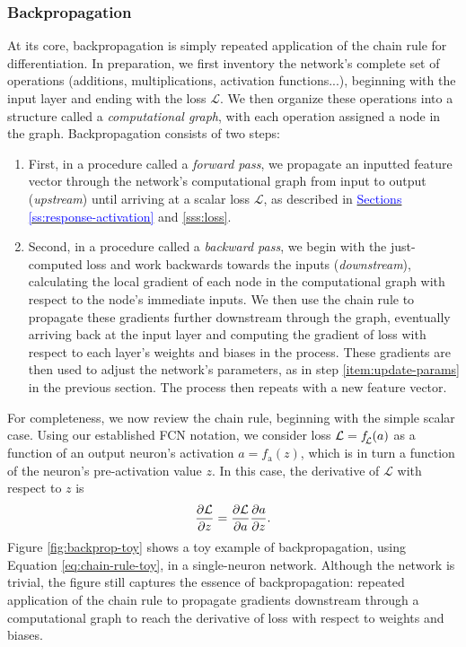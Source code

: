 \documentclass[11pt, a4paper]{article}
\newcommand{\myhref}[2]{\hyperref[#1]{\textcolor{blue}{#2}}}
\begin{document}
\subsubsection{Backpropagation}
At its core, backpropagation is simply repeated application of the chain rule for differentiation.
In preparation, we first inventory the network's complete set of operations (additions, multiplications, activation functions...), beginning with the input layer and ending with the loss $ \mathcal{L} $.
We then organize these operations into a structure called a \textit{computational graph}, with each operation assigned a node in the graph.
Backpropagation consists of two steps:
\begin{enumerate}

    \item First, in a procedure called a \textit{forward pass}, we propagate an inputted feature vector through the network's computational graph from input to output (\textit{upstream}) until arriving at a scalar loss $ \mathcal{L} $, as described in \myhref{ss:response-activation}{Sections \ref{ss:response-activation}} and \ref{sss:loss}.

    \item Second, in a procedure called a \textit{backward pass}, we begin with the just-computed loss and work backwards towards the inputs (\textit{downstream}), calculating the local gradient of each node in the computational graph with respect to the node's immediate inputs.
    We then use the chain rule to propagate these gradients further downstream through the graph, eventually arriving back at the input layer and computing the gradient of loss with respect to each layer's weights and biases in the process.
    These gradients are then used to adjust the network's parameters, as in step \ref{item:update-params} in the previous section.
    The process then repeats with a new feature vector.

\end{enumerate}


For completeness, we now review the chain rule, beginning with the simple scalar case.
Using our established FCN notation, we consider loss $ \mathcal{L} = f_{\raisebox{-0.4ex}{\scalebox{0.7}{$\mspace{-3mu} \mathcal{L}$}}}(a) $ as a function of an output neuron's activation $ a = f_{\text{a}}(z) $, which is in turn a function of the neuron's pre-activation value $ z $.
In this case, the derivative of $ \mathcal{L} $ with respect to $ z $ is
\begin{equation}
    \pdv{\mathcal{L}}{z} = \pdv{\mathcal{L}}{a} \pdv{a}{z}. \label{eq:chain-rule-toy}
\end{equation}
Figure \ref{fig:backprop-toy} shows a toy example of backpropagation, using Equation \ref{eq:chain-rule-toy}, in a single-neuron network.
Although the network is trivial, the figure still captures the essence of backpropagation: repeated application of the chain rule to propagate gradients downstream through a computational graph to reach the derivative of loss with respect to weights and biases.
\end{document}
